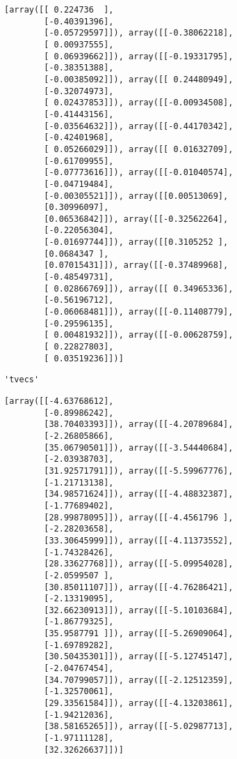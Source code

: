 \documentclass[11pt]{article}
\begin{document}
    
    
    \begin{verbatim}
[array([[ 0.224736  ],
        [-0.40391396],
        [-0.05729597]]), array([[-0.38062218],
        [ 0.00937555],
        [ 0.06939662]]), array([[-0.19331795],
        [-0.38351388],
        [-0.00385092]]), array([[ 0.24480949],
        [-0.32074973],
        [ 0.02437853]]), array([[-0.00934508],
        [-0.41443156],
        [-0.03564632]]), array([[-0.44170342],
        [-0.42401968],
        [ 0.05266029]]), array([[ 0.01632709],
        [-0.61709955],
        [-0.07773616]]), array([[-0.01040574],
        [-0.04719484],
        [-0.00305521]]), array([[0.00513069],
        [0.30996097],
        [0.06536842]]), array([[-0.32562264],
        [-0.22056304],
        [-0.01697744]]), array([[0.3105252 ],
        [0.0684347 ],
        [0.07015431]]), array([[-0.37489968],
        [-0.48549731],
        [ 0.02866769]]), array([[ 0.34965336],
        [-0.56196712],
        [-0.06068481]]), array([[-0.11408779],
        [-0.29596135],
        [ 0.00481932]]), array([[-0.00628759],
        [ 0.22827803],
        [ 0.03519236]])]
    \end{verbatim}

    
    
    \begin{verbatim}
'tvecs'
    \end{verbatim}

    
    
    \begin{verbatim}
[array([[-4.63768612],
        [-0.89986242],
        [38.70403393]]), array([[-4.20789684],
        [-2.26805866],
        [35.06790501]]), array([[-3.54440684],
        [-2.03938703],
        [31.92571791]]), array([[-5.59967776],
        [-1.21713138],
        [34.98571624]]), array([[-4.48832387],
        [-1.77689402],
        [28.99878095]]), array([[-4.4561796 ],
        [-2.28203658],
        [33.30645999]]), array([[-4.11373552],
        [-1.74328426],
        [28.33627768]]), array([[-5.09954028],
        [-2.0599507 ],
        [30.85011107]]), array([[-4.76286421],
        [-2.13319095],
        [32.66230913]]), array([[-5.10103684],
        [-1.86779325],
        [35.9587791 ]]), array([[-5.26909064],
        [-1.69789282],
        [30.50435301]]), array([[-5.12745147],
        [-2.04767454],
        [34.70799057]]), array([[-2.12512359],
        [-1.32570061],
        [29.33561584]]), array([[-4.13203861],
        [-1.94212036],
        [38.58165265]]), array([[-5.02987713],
        [-1.97111128],
        [32.32626637]])]
    \end{verbatim}
\end{document}
